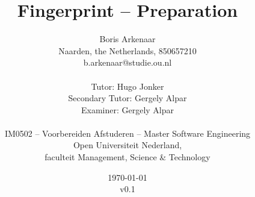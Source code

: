 \title{Fingerprint -- Preparation}
\author{
  Boris Arkenaar\\
  Naarden, the Netherlands, 850657210\\
  b.arkenaar@studie.ou.nl\\
  \\
  Tutor: Hugo Jonker\\
  Secondary Tutor: Gergely Alpar\\
  Examiner: Gergely Alpar\\
  \\
  IM0502 -- Voorbereiden Afstuderen -- Master Software Engineering\\
  Open Universiteit Nederland,\\
  faculteit Management, Science \& Technology}
\date{\today\\v0.1}
\maketitle
